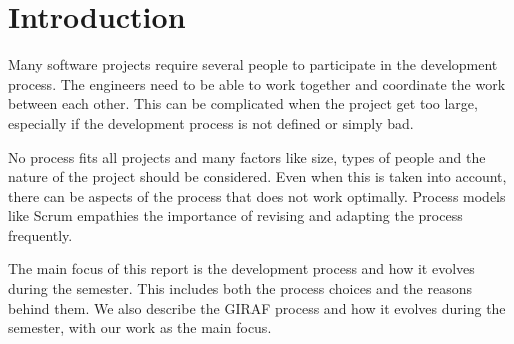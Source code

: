 \section{Introduction}

Many software projects require several people to participate in the development process. The engineers need to be able to work together and coordinate the work between each other. This can be complicated when the project get too large, especially if the development process is not defined or simply bad.

No process fits all projects and many factors like size, types of people and the nature of the project should be considered. Even when this is taken into account, there can be aspects of the process that does not work optimally. Process models like \gls{Scrum} empathies the importance of revising and adapting the process frequently\cite{Scrum}.


The main focus of this report is the development process and how it evolves during the semester. This includes both the process choices and the reasons behind them. We also describe the GIRAF process and how it evolves during the semester, with our work as the main focus.

